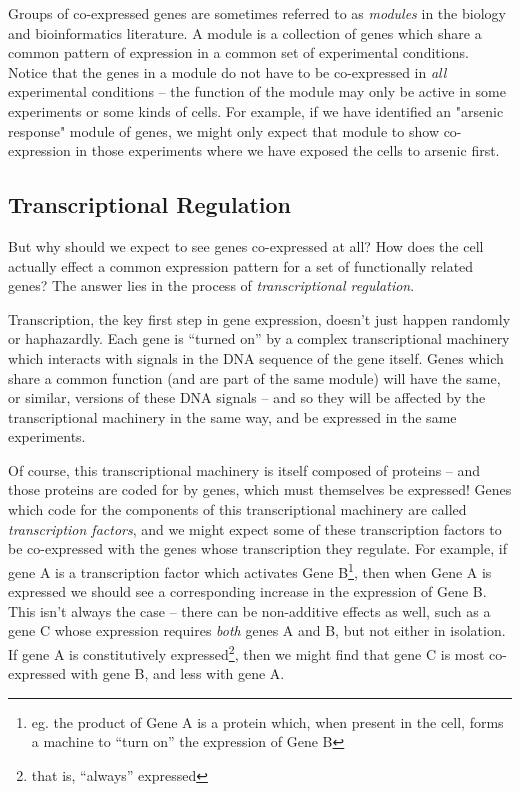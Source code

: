 \documentclass{article}
\begin{document}
Groups of co-expressed genes are sometimes referred to as \emph{modules} in the biology and bioinformatics literature.  
A module is a collection of genes which share a common pattern of expression in a common set of experimental conditions.  
Notice that the genes in a module do not have to be co-expressed in \emph{all} experimental conditions -- the function of the module may only be active in some experiments or some kinds of cells.  
For example, if we have identified an "arsenic response" module of genes, we might only expect that module to show co-expression in those experiments where we have exposed the cells to arsenic first.  

\subsection{Transcriptional Regulation}

But why should we expect to see genes co-expressed at all?  
How does the cell actually effect a common expression pattern for a set of functionally related genes?  
The answer lies in the process of \emph{transcriptional regulation}.  

Transcription, the key first step in gene expression, doesn't just happen randomly or haphazardly.  
Each gene is ``turned on'' by a complex transcriptional machinery which interacts with signals in the DNA sequence of the gene itself.  
Genes which share a common function (and are part of the same module) will have the same, or similar, versions of these DNA signals -- and so they will be affected by the transcriptional machinery in the same way, and be expressed in the same experiments.  

Of course, this transcriptional machinery is itself composed of proteins -- and those proteins are coded for by genes, which must themselves be expressed! 
Genes which code for the components of this transcriptional machinery are called \emph{transcription factors}, and we might expect some of these transcription factors to be co-expressed with the genes whose transcription they regulate.  
For example, if gene A is a transcription factor which activates Gene B\footnote{eg. the product of Gene A is a protein which, when present in the cell, forms a machine to ``turn on'' the expression of Gene B}, then when Gene A is expressed we should see a corresponding increase in the expression of Gene B.  
This isn't always the case -- there can be non-additive effects as well, such as a gene C whose expression requires \emph{both} genes A and B, but not either in isolation.  
If gene A is constitutively expressed\footnote{that is, ``always'' expressed}, then we might find that gene C is most co-expressed with gene B, and less with gene A.  
\end{document}
